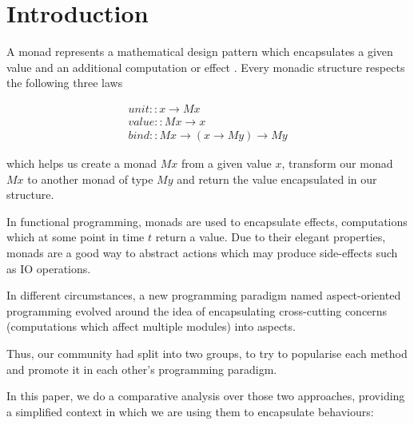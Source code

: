 \section{Introduction}
\label{sec::introduction}

A monad represents a mathematical design pattern which encapsulates a given value and an additional computation or effect \cite{inproceedings}. Every monadic structure respects the following three laws

\begin{equation*}
\begin{gathered}
    unit :: x \rightarrow M x \\
    value :: M x \rightarrow x \\
    bind ::  M x \rightarrow (x \rightarrow M y) \rightarrow My
\end{gathered}
\end{equation*}

which helps us create a monad $M x$ from a given value $x$, transform our monad $M x$ to another monad of type $M y$ and return the value encapsulated in our structure. \cite{inproceedings}

In functional programming, monads are used to encapsulate effects, computations which at some point in time $t$ return a value. Due to their elegant properties, monads are a good way to abstract actions which may produce side-effects such as IO operations.

In different circumstances, a new programming paradigm named aspect-oriented programming evolved around the idea of encapsulating cross-cutting concerns (computations which affect multiple modules) into aspects. 

Thus, our community had split into two groups, to try to popularise each method and promote it in each other's programming paradigm.

In this paper, we do a comparative analysis over those two approaches, providing a simplified context in which we are using them to encapsulate behaviours: 

